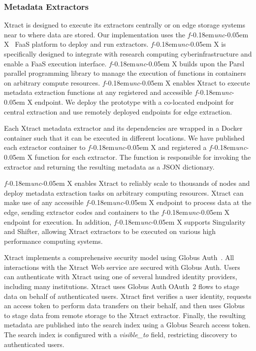 \documentclass[sigconf]{acmart}
\newcommand{\name}{Xtract}
\newcommand{\funcx}{$f$\kern-0.18em\emph{unc}\kern-0.05em X}
\begin{document}
\subsubsection{Metadata Extractors}
\name{} is designed to execute its extractors centrally or on edge storage systems near to where
data are stored. 
Our implementation uses the \funcx~\cite{chard2019serverless} FaaS platform 
to deploy and run extractors. 
\funcx{} is specifically designed to integrate with research computing 
cyberinfrastructure and enable a FaaS execution interface. 
\funcx{} builds upon the Parsl~\cite{babuji2019parsl} parallel programming library to 
manage the execution of functions in containers on arbitrary compute resources. 
\funcx{} enables \name{} to execute metadata extraction functions at any registered 
and accessible \funcx{} endpoint. 
We deploy the prototype with a co-located endpoint for central extraction
and use remotely deployed endpoints for edge extraction.

Each \name{} metadata extractor and its dependencies are wrapped in a Docker container
such that it can be executed in different locations. 
We have published each extractor container to \funcx{} and registered a \funcx{} function for 
each extractor. The function is responsible for invoking the extractor and returning the 
resulting metadata as a JSON dictionary. 

\funcx{} enables \name{} to reliably scale to thousands of nodes and deploy 
metadata extraction tasks on arbitrary computing resources. 
\name{} can make use of any accessible \funcx{} endpoint to process data at the edge, 
sending extractor codes and containers to the \funcx{} endpoint for execution. In addition, 
\funcx{} supports Singularity and Shifter, allowing \name{} extractors to be executed
on various high performance computing systems. 

\name{} implements a comprehensive security model using Globus Auth~\cite{tuecke2016globus}. 
All interactions with the \name{} Web service are secured with Globus Auth. 
Users can authenticate with \name{} using one of 
several hundred identity providers, including many institutions. 
\name{} uses Globus Auth OAuth~2 flows to stage data on behalf
of authenticated users. \name{} first verifies a user identity, requests an access
token to perform data transfers on their behalf, and then uses Globus to stage
data from remote storage to the \name{} extractor. 
Finally, the resulting metadata are published into the search index using a Globus Search
access token. The search index is configured with a \textit{visible\_to} field, restricting
discovery to authenticated users.
\end{document}
